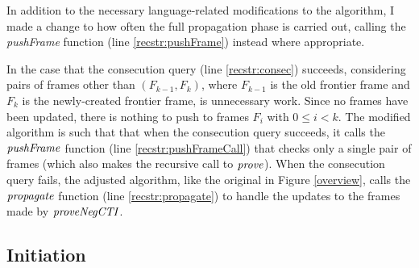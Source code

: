 \documentclass[12pt,a4paper,twoside,openright]{report}
\begin{document}
{In addition to the necessary language-related modifications to the algorithm, I made a
change to how often the full propagation phase is carried out, calling the {\it pushFrame}
function (line \ref{recstr:pushFrame}) instead where appropriate.


In the case that the consecution query (line \ref{recstr:consec}) succeeds,
considering pairs of frames other
than $(F_{k - 1}, F_k)$, where $F_{k - 1}$ is the old frontier frame and $F_k$ is
the newly-created frontier frame, is unnecessary work.
Since no frames have been updated, there is nothing to push to frames $F_i$ with
$0 \leq i < k$.
The modified algorithm is such that
that when the consecution query succeeds, it calls the ${\it pushFrame}$ function
(line \ref{recstr:pushFrameCall}) that
checks only a single pair of frames (which also makes the recursive call to ${\it prove}$).
When the consecution query fails, the adjusted algorithm, like the original in Figure \ref{overview},
calls the ${\it propagate}$ function (line \ref{recstr:propagate})
to handle the updates to the frames made by ${\it proveNegCTI}$.


\subsection{Initiation}

}
\end{document}
